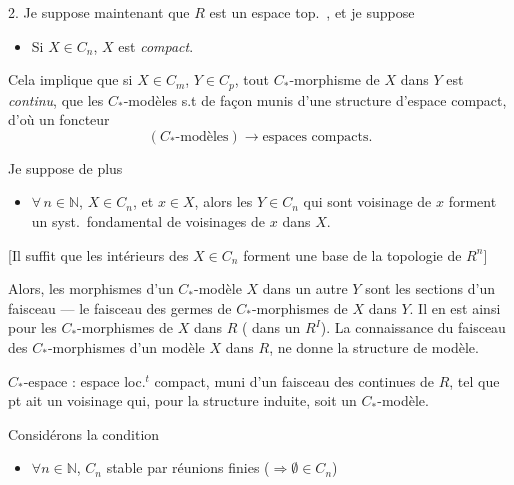 \documentclass[11pt,a4paper]{article}
\begin{document}
2. Je suppose maintenant que $R$ est un espace top.\ , et je
suppose 
\begin{itemize}
  \item[(7)] Si $X \in C_n$, $X$ est \emph{compact}.
\end{itemize}

Cela implique que si $X \in C_m$, $Y \in C_p$, tout $C_{*}$-morphisme de $X$
dans $Y$ est \emph{continu}, que les $C_{*}$-modèles s.t de façon
 munis d'une structure d'espace compact, d'où un
foncteur
\[
  (C_{*}\text{-modèles}) \longrightarrow \text{espaces compacts.}
\]

Je suppose de plus
\begin{itemize}
  \item[(8)] $\forall\, n \in \mathbb{N}$, $X \in C_n$, et $x \in X$,
  alors  les $Y \in C_n$ qui  sont voisinage de $x$ forment un
  syst.\ fondamental de voisinages de $x$ dans $X$.
\end{itemize}
[Il suffit que \struck{\ill{}} les intérieurs des $X \in C_n$ forment une
base de la topologie de $R^n$]\marginal{\ill{} \ill{} \ill{}}

Alors, les morphismes d'un $C_{*}$-modèle $X$ dans un autre
$Y$ sont les sections d'un faisceau --- le faisceau des germes de
$C_{*}$-morphismes de $X$ dans $Y$. Il en est ainsi pour les
$C_{*}$-morphismes de $X$ dans $R$ (\ill{} dans un $R^I$). La connaissance
du faisceau des $C_{*}$-morphismes d'un modèle $X$  dans $R$, ne donne
 la structure de modèle.

$C_{*}$-espace : espace loc.$^t$ compact, muni d'un faisceau \ill{}
 des  continues \ill{} \ill{} \ill{}
\ill{} de $R$, tel que \ill{} pt ait un voisinage 
\struck{\ill{}} qui, pour la structure induite, soit un $C_{*}$-modèle.


Considérons la condition
\begin{itemize}
  \item[(6)] \struck{$\forall$} $\forall n \in \mathbb{N}$, $C_n$ stable
  par réunions finies \quad ($\Rightarrow \emptyset \in C_n$)
\end{itemize}
\end{document}

